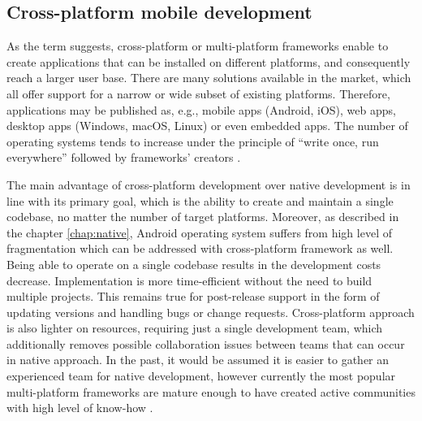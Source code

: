 
\subsection{Cross-platform mobile development}

As the term suggests, cross-platform or multi-platform frameworks enable to create applications that can be installed on different platforms, and consequently reach a larger user base. There are many solutions available in the market, which all offer support for a narrow or wide subset of existing platforms. Therefore, applications may be published as, e.g., mobile apps (Android, iOS), web apps, desktop apps (Windows, macOS, Linux) or even embedded apps. The number of operating systems tends to increase under the principle of ``write once, run everywhere'' followed by frameworks' creators \cite{comparison_technologies_multiplatform}. 

The main advantage of cross-platform development over native development is in line with its primary goal, which is the ability to create and maintain a single codebase, no matter the number of target platforms. Moreover, as described in the chapter \ref{chap:native}, Android operating system suffers from high level of fragmentation which can be addressed with cross-platform framework as well. Being able to operate on a single codebase results in the development costs decrease. Implementation is more time-efficient without the need to build multiple projects. This remains true for post-release support in the form of updating versions and handling bugs or change requests. Cross-platform approach is also lighter on resources, requiring just a single development team, which additionally removes possible collaboration issues between teams that can occur in native approach. In the past, it would be assumed it is easier to gather an experienced team for native development, however currently the most popular multi-platform frameworks are mature enough to have created active communities with high level of know-how \cite{approach_to_assess_performance_case_study,comparison_perf_looks_flutter_native,comp_analysis_hybrid_frameworks}.



